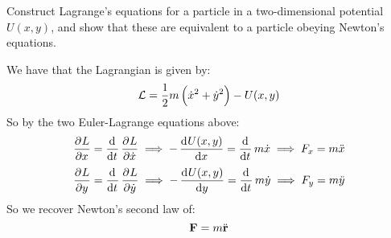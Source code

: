 \begin{p}
Construct Lagrange’s equations for a particle in a two-dimensional potential $U(x,y)$, and show that these are equivalent to a particle obeying Newton’s equations.
\end{p}
\begin{s}
We have that the Lagrangian is given by:
\[\mathcal{L} = \frac{1}{2}m\left(\dot{x}^2+\dot{y}^2\right) - U(x,y)\]
So by the two Euler-Lagrange equations above:
\[\dpd{L}{x} = \dod{}{t}\dpd{L}{\dot{x}} \implies -\dod{U(x,y)}{x} = \dod{}{t}m\dot{x} \implies F_x = m \ddot{x} \]
\[\dpd{L}{y} = \dod{}{t}\dpd{L}{\dot{y}} \implies -\dod{U(x,y)}{y} = \dod{}{t}m\dot{y} \implies F_y = m \ddot{y} \]
So we recover Newton's second law of:
\[\mathbf{F} = m\ddot{\mathbf{r}}\]
\end{s}